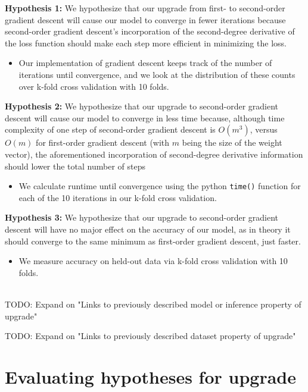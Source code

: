 \documentclass[11pt]{extarticle}
\begin{document}
\textbf{Hypothesis 1:} We hypothesize that our upgrade from first- to second-order gradient descent will cause our model to converge in fewer iterations because second-order gradient descent's incorporation of the second-degree derivative of the loss function should make each step more efficient in minimizing the loss.

\begin{itemize}
\item Our implementation of gradient descent keeps track of the number of iterations until convergence, and we look at the distribution of these counts over k-fold cross validation with 10 folds.
\end{itemize}

\textbf{Hypothesis 2:} We hypothesize that our upgrade to second-order gradient descent will cause our model to converge in less time because, although time complexity of one step of second-order gradient descent is $O(m^3)$, versus $O(m)$ for first-order gradient descent (with $m$ being the size of the weight vector), the aforementioned incorporation of second-degree derivative information should lower the total number of steps 

\begin{itemize}
\item We calculate runtime until convergence using the python \texttt{time()} function for each of the 10 iterations in our k-fold cross validation.
\end{itemize}

\textbf{Hypothesis 3:} We hypothesize that our upgrade to second-order gradient descent will have no major effect on the accuracy of our model, as in theory it should converge to the same minimum as first-order gradient descent, just faster.

\begin{itemize}
\item We measure accuracy on held-out data via k-fold cross validation with 10 folds.
\end{itemize}

~~\\

TODO: Expand on "Links to previously described model or inference property of upgrade"

TODO: Expand on "Links to previously described dataset property of upgrade"

\newpage

\section{Evaluating hypotheses for upgrade}
\end{document}
